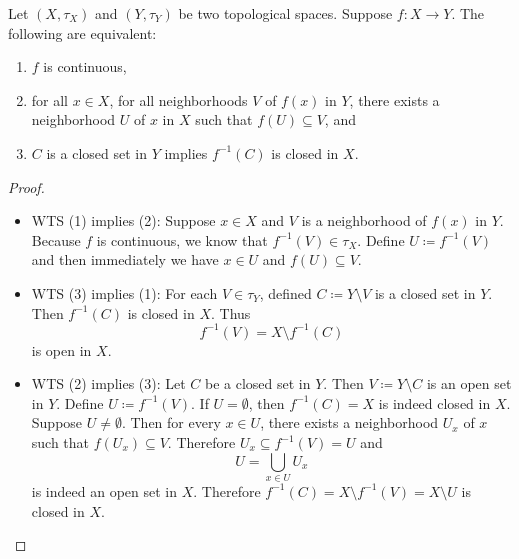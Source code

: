 \documentclass[screen,single]{techreport}
\numberwithin{equation}{section}
\begin{document}
\begin{proposition}\label{Prop:SomeEquivResultsAboutContFunc}
	Let $(X,\tau_X)$ and $(Y,\tau_Y)$ be two topological spaces.
	Suppose $f : X \to Y$.
	The following are equivalent:
	\begin{enumerate}
		\item $f$ is continuous,
		\item for all $x \in X$, for all neighborhoods $V$ of $f(x)$ in $Y$, there exists a neighborhood $U$ of $x$ in $X$ such that $f(U) \subseteq V$, and
		\item $C$ is a closed set in $Y$ implies $f^{-1}(C)$ is closed in $X$.
	\end{enumerate}
\end{proposition}
\begin{proof}\
	\begin{itemize}
		\item WTS (1) implies (2): Suppose $x \in X$ and $V$ is a neighborhood of $f(x)$ in $Y$.
		Because $f$ is continuous, we know that $f^{-1}(V) \in \tau_X$.
		Define $U \coloneqq f^{-1}(V)$ and then immediately we have $x \in U$ and $f(U) \subseteq V$.
		
		\item WTS (3) implies (1):
		For each $V \in \tau_Y$, defined $C \coloneqq Y \setminus V$ is a closed set in $Y$.
		Then $f^{-1}(C)$ is closed in $X$.
		Thus
		\[
		f^{-1}(V) = X \setminus f^{-1}(C)
		\]
		is open in $X$.
		
		\item WTS (2) implies (3): Let $C$ be a closed set in $Y$.
		Then $V \coloneqq Y \setminus C$ is an open set in $Y$.
		Define $U \coloneqq f^{-1}(V)$.
		If $U = \emptyset$, then $f^{-1}(C) = X$ is indeed closed in $X$.
		Suppose $U \neq \emptyset$.
		Then for every $x \in U$, there exists a neighborhood $U_x$ of $x$ such that $f(U_x) \subseteq V$.
		Therefore $U_x \subseteq f^{-1}(V) = U$ and
		\[
		U = \bigcup_{x \in U} U_x
		\]
		is indeed an open set in $X$.
		Therefore $f^{-1}(C) = X \setminus f^{-1}(V) = X \setminus U$ is closed in $X$.
	\end{itemize}
\end{proof}
\end{document}
